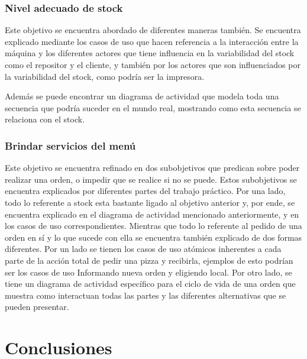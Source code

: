 \documentclass[a4paper,10pt]{article}
\begin{document}
\subsubsection*{Nivel adecuado de stock}

Este objetivo se encuentra abordado de diferentes maneras tambi\'en. Se encuentra explicado mediante los casos de uso que hacen referencia a la 
interacci\'on entre la m\'aquina y los diferentes actores que tiene influencia en la variabilidad del stock como el repositor y el cliente, y 
tambi\'en por los actores que son influenciados por la variabilidad del stock, como podr\'ia ser la impresora.

Adem\'as se puede encontrar un diagrama de actividad que modela toda una secuencia que podr\'ia suceder en el mundo real, mostrando como 
esta secuencia se relaciona con el stock.

\subsubsection*{Brindar servicios del men\'u}

Este objetivo se encuentra refinado en dos subobjetivos que predican sobre poder realizar una orden, o impedir que se realice si no se puede.
Estos subobjetivos se encuentra explicados por diferentes partes del trabajo pr\'actico. Por una lado, todo lo referente a stock esta bastante
ligado al objetivo anterior y, por ende, se encuentra explicado en el diagrama de actividad mencionado anteriormente, y en los casos de uso correspondientes.
Mientras que todo lo referente al pedido de una orden en s\'i y lo que sucede con ella se encuentra tambi\'en explicado de dos formas diferentes.
Por un lado se tienen los casos de uso at\'omicos inherentes a cada parte de la acci\'on total de pedir una pizza y recibirla, ejemplos de esto
podr\'ian ser los casos de uso Informando nueva orden y eligiendo local. Por otro lado, se tiene un diagrama de actividad espec\'ifico para el
ciclo de vida de una orden que muestra como interactuan todas las partes y las diferentes alternativas que se pueden presentar.


\newpage
\section*{Conclusiones}
\end{document}
